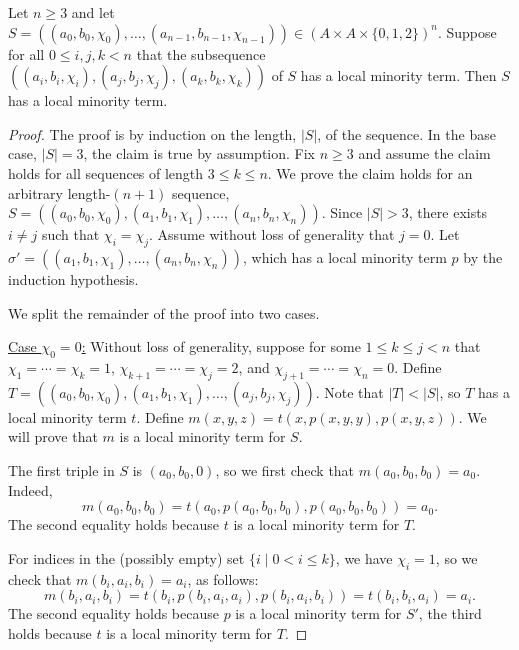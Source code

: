\begin{thm}
  Let $n\geq 3$ and let
  $S  = ((a_0, b_0, \chi_0), \dots, (a_{n-1}, b_{n-1}, \chi_{n-1}))
  \in (A\times A \times \{0,1,2\})^n$.
  Suppose for all
  $0\leq i, j, k <n$ that the subsequence 
  $((a_i, b_i, \chi_i), (a_j, b_j, \chi_j), (a_k, b_k, \chi_k))$ of $S$ 
  has a local minority term.  Then $S$ has a local minority term.
\end{thm}
\begin{proof}
  The proof is by induction on the length, $|S|$, of the sequence.  In the base
  case, $|S| = 3$, the claim is true by assumption.
  Fix $n\geq 3$ and assume the claim holds for all sequences of length
  $3\leq k\leq n$.
  We prove the claim holds for an arbitrary length-$(n+1)$ sequence, 
  $S = ((a_0, b_0, \chi_0), (a_1, b_1, \chi_1), \dots, (a_{n}, b_{n}, \chi_{n}))$.
  Since $|S|>3$, there exists $i \neq j$ such that $\chi_i = \chi_j$.
  Assume without loss of generality that $j=0$.
  Let $\sigma' = ((a_1, b_1, \chi_1), \dots, (a_{n}, b_{n}, \chi_{n}))$, which
  has a local minority term $p$ by the induction hypothesis.

  We split the remainder of the proof into two cases.

  \medskip

  \noindent \underline{Case $\chi_0 = 0$:}
  Without loss of generality, suppose for some $1\leq k \leq j < n$ that
  $\chi_1 =  \cdots =\chi_k = 1$,
  $\chi_{k+1}  = \cdots = \chi_{j} = 2$, and
  $\chi_{j+1} = \cdots = \chi_{n} = 0$.
  Define
  $T = ((a_0, b_0, \chi_0), (a_1, b_1, \chi_1), \dots, (a_j, b_j, \chi_j))$.
  Note that $|T| < |S|$, so $T$ has a local minority term $t$.
  Define
                $m(x,y,z) = t(x, p(x,y,y), p(x,y,z))$.
  We will prove that $m$ is a local minority term for $S$.

  The first triple in $S$ is $(a_0, b_0, 0)$, so we first check that
  $m(a_0,b_0,b_0)= a_0$. Indeed,
  \[
  m(a_0,b_0,b_0) = t(a_0, p(a_0, b_0, b_0), p(a_0, b_0, b_0)) = a_0.
  \]
  The second equality holds because $t$ is a local minority term for $T$.

  For indices in the (possibly empty) set $\{i \mid 0 < i \leq k\}$, we have
  $\chi_i = 1$, so we check that $m(b_i, a_i, b_i) = a_i$, as follows:
  \[
  m(b_i,a_i,b_i) = t(b_i, p(b_i, a_i, a_i), p(b_i, a_i, b_i)) = t(b_i, b_i, a_i)
  = a_i.
  \]
  The second equality holds because $p$ is a local minority term for $S'$, the
  third holds because $t$ is a local minority term for $T$.


\end{proof}
